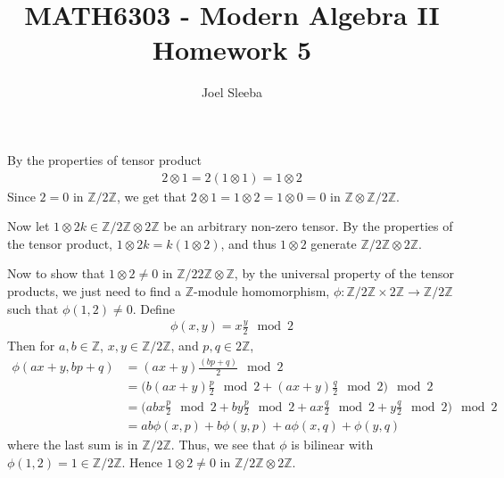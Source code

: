 \documentclass[12pt]{exam}
\theoremstyle{plain} %
\theoremstyle{definition} %
\theoremstyle{remark} %
\begin{document}
\title{MATH6303 - Modern Algebra II \\ Homework 5}

\author{
  Joel Sleeba \\
}

\maketitle
\printanswers
\unframedsolutions

\begin{questions}

  \question
  \begin{solution}
    By the properties of tensor product
    \begin{align*}
      2 \otimes 1 = 2(1 \otimes 1) = 1 \otimes 2
    \end{align*}
    Since $2 = 0$ in $\mathbb{Z}/ 2 \mathbb{Z}$, we get that $2
    \otimes 1 = 1 \otimes 2 = 1 \otimes 0 = 0$ in $\mathbb{Z} \otimes
    \mathbb{Z}/2 \mathbb{Z}$.

    Now let $1 \otimes 2k \in \mathbb{Z}/ 2 \mathbb{Z} \otimes 2
    \mathbb{Z}$ be an arbitrary non-zero tensor. By the properties of
    the tensor product, $1 \otimes
    2k = k( 1 \otimes 2)$, and thus $1 \otimes 2$ generate
    $\mathbb{Z}/ 2 \mathbb{Z} \otimes 2 \mathbb{Z}$.

    Now to show that $1 \otimes 2 \neq 0$ in $\mathbb{Z}/2 2\mathbb{Z}
    \otimes \mathbb{Z}$, by the universal property of the tensor
    products, we just need to find a $\mathbb{Z}$-module homomorphism,
    $\phi: \mathbb{Z}/2 \mathbb{Z} \times 2\mathbb{Z} \to
    \mathbb{Z}/2 \mathbb{Z}$
    such that $\phi(1, 2) \neq 0$. Define
    \begin{align*}
      \phi(x, y) = x \frac{y}{2} \mod 2
    \end{align*}
    Then for $a, b \in \mathbb{Z}$, $x, y \in \mathbb{Z}/2
    \mathbb{Z}$, and $p, q \in 2 \mathbb{Z}$,
    \begin{align*}
      \phi(ax+ y, bp + q) &= (a x + y) \frac{(bp+q)}{2} \mod 2 \\
      &= \Big(b(ax + y) \frac{p}{2} \mod 2 + (ax + y) \frac{q}{2}
      \mod 2\Big) \mod 2 \\
      &= \Big(abx \frac{p}{2} \mod 2 + by \frac{p}{2} \mod 2 + a x
      \frac{q}{2} \mod   2 + y \frac{q}{2} \mod 2\Big) \mod 2 \\
      &=  ab\phi(x, p) + b \phi(y, p) + a\phi(x, q) + \phi(y, q)
    \end{align*}
    where the last sum is in $\mathbb{Z}/ 2 \mathbb{Z}$. Thus, we see
    that $\phi$ is bilinear with $ \phi(1, 2) = 1 \in \mathbb{Z}/ 2
    \mathbb{Z}$. Hence $1 \otimes 2 \neq 0$ in $\mathbb{Z}/2
    \mathbb{Z} \otimes 2 \mathbb{Z}$.
  \end{solution}


\end{questions}
\end{document}
